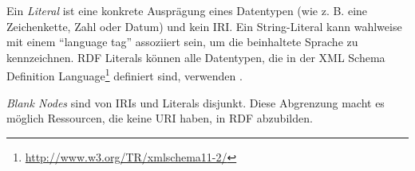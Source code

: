 Ein \textit{Literal} ist eine konkrete Ausprägung eines Datentypen (wie z. B. eine Zeichenkette, Zahl oder Datum) und kein IRI. Ein String-Literal kann wahlweise mit einem \hyphenquote{german}{language tag} assoziiert sein, um die beinhaltete Sprache zu kennzeichnen. RDF Literals können alle Datentypen, die in der XML Schema Definition Language\footnote{\url{http://www.w3.org/TR/xmlschema11-2/}} definiert sind, verwenden \parencite[vgl.][Abs. 5]{Wood:14:RCA}. 

\textit{Blank Nodes} sind von IRIs und Literals disjunkt. Diese Abgrenzung macht es möglich Ressourcen, die keine URI haben, in RDF abzubilden. 
